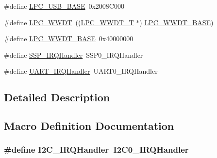 \begin{DoxyCompactItemize}
\item 
\#define \hyperlink{group__PERIPH__177X__8X__BASE_gaa619008881e9f76dc31131313eff1b79}{L\+P\+C\+\_\+\+U\+S\+B\+\_\+\+B\+A\+SE}~0x2008\+C000
\item 
\#define \hyperlink{group__PERIPH__177X__8X__BASE_ga235e068b1412366044449dba68194c55}{L\+P\+C\+\_\+\+W\+W\+DT}~((\hyperlink{structLPC__WWDT__T}{L\+P\+C\+\_\+\+W\+W\+D\+T\+\_\+T}             $\ast$) \hyperlink{group__PERIPH__407X__8X__BASE_ga9b83c39ba53f9c9e87974984c96e35de}{L\+P\+C\+\_\+\+W\+W\+D\+T\+\_\+\+B\+A\+SE})
\item 
\#define \hyperlink{group__PERIPH__177X__8X__BASE_ga9b83c39ba53f9c9e87974984c96e35de}{L\+P\+C\+\_\+\+W\+W\+D\+T\+\_\+\+B\+A\+SE}~0x40000000
\item 
\#define \hyperlink{group__PERIPH__177X__8X__BASE_gac4eb0fc5d2f19b89fa77194876b63df4}{S\+S\+P\+\_\+\+I\+R\+Q\+Handler}~S\+S\+P0\+\_\+\+I\+R\+Q\+Handler
\item 
\#define \hyperlink{group__PERIPH__177X__8X__BASE_gaf6a20f8c9320377f3713d96ea90bfd10}{U\+A\+R\+T\+\_\+\+I\+R\+Q\+Handler}~U\+A\+R\+T0\+\_\+\+I\+R\+Q\+Handler
\end{DoxyCompactItemize}


\subsection{Detailed Description}


\subsection{Macro Definition Documentation}
\subsubsection[{\texorpdfstring{I2\+C\+\_\+\+I\+R\+Q\+Handler}{I2C_IRQHandler}}]{\setlength{\rightskip}{0pt plus 5cm}\#define I2\+C\+\_\+\+I\+R\+Q\+Handler~I2\+C0\+\_\+\+I\+R\+Q\+Handler}\hypertarget{group__PERIPH__177X__8X__BASE_ga78bc9c1986ea5da20688e1db532c5717}{}\label{group__PERIPH__177X__8X__BASE_ga78bc9c1986ea5da20688e1db532c5717}


